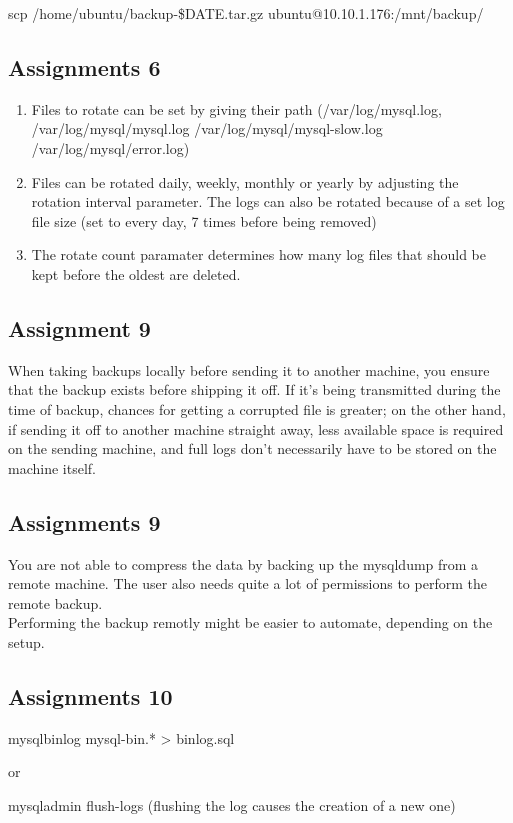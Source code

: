 scp /home/ubuntu/backup-\$DATE.tar.gz ubuntu@10.10.1.176:/mnt/backup/

\subsection{Assignments 6} 
\begin{enumerate}
\item Files to rotate can be set by giving their path (/var/log/mysql.log, /var/log/mysql/mysql.log /var/log/mysql/mysql-slow.log /var/log/mysql/error.log)
\item Files can be rotated daily, weekly, monthly or yearly by adjusting the rotation interval parameter. The logs can also be rotated because of a set log file size (set to every day, 7 times before being removed)
\item The rotate count paramater determines how many log files that should be kept before the oldest are deleted.
\end{enumerate}
	

\subsection{Assignment 9} 
When taking backups locally before sending it to another machine, you ensure that the backup exists before shipping it off. If it's being transmitted during the time of backup, chances for getting a corrupted file is greater; on the other hand, if sending it off to another machine straight away, less available space is required on the sending machine, and full logs don't necessarily have to be stored on the machine itself. 


\subsection{Assignments 9} 
You are not able to compress the data by backing up the mysqldump from a remote machine. The user also needs quite a lot of permissions to perform the remote backup.\\
Performing the backup remotly might be easier to automate, depending on the setup.

\subsection{Assignments 10} 
mysqlbinlog mysql-bin.* > binlog.sql

or 

mysqladmin flush-logs (flushing the log causes the creation of a new one)

